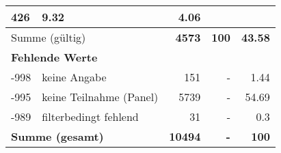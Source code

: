 \begin{longtable}{lXrrr}
       \num{426} &
       \num[round-mode=places,round-precision=2]{9,32} &
         \num[round-mode=places,round-precision=2]{4,06} \\
     \midrule
     \multicolumn{2}{l}{Summe (gültig)} &
       \textbf{\num{4573}} &
     \textbf{100} &
       \textbf{\num[round-mode=places,round-precision=2]{43,58}} \\
     \multicolumn{5}{l}{\textbf{Fehlende Werte}}\\
       -998 &
       keine Angabe &
         \num{151} &
        - &
         \num[round-mode=places,round-precision=2]{1,44} \\
       -995 &
       keine Teilnahme (Panel) &
         \num{5739} &
        - &
         \num[round-mode=places,round-precision=2]{54,69} \\
       -989 &
       filterbedingt fehlend &
         \num{31} &
        - &
         \num[round-mode=places,round-precision=2]{0,3} \\
     \midrule
     \multicolumn{2}{l}{\textbf{Summe (gesamt)}} &
          \textbf{\num{10494}} &
        \textbf{-} &
        \textbf{100} \\
     \bottomrule
     \end{longtable}
     
